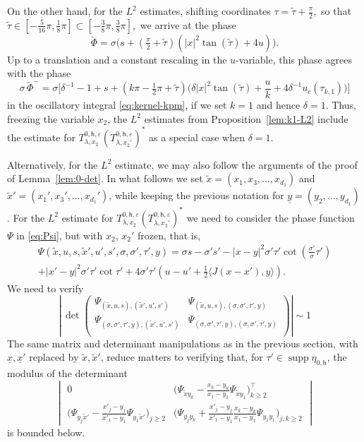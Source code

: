 \documentclass[leqno]{amsart}
\theoremstyle{definition}
\theoremstyle{remark}
\numberwithin{equation}{section}
\DeclareMathOperator*{\supp}{supp}
\begin{document}
On the other hand, for the $L^2$ estimates, shifting  coordinates $\tau=\tilde \tau +\tfrac \pi 2,$ so that $\tilde \tau\in [-\tfrac 5{16} \pi, \tfrac 18 \pi]\subset[-\tfrac 38 \pi,\tfrac 38\pi],$ we arrive at the phase
\begin{equation}\label{eq:brevePhi-0}
\breve\Phi
 = \sigma\big(s+(\tfrac \pi 2+\tilde\tau )(|x|^2 \tan(\tilde\tau) + 4u)\big).
\end{equation}
Up to a translation and a constant rescaling in the $u$-variable, this phase agrees with the phase
\[
\sigma \, \tilde \Phi^{-} = \sigma\Big[\delta^{-1}-1+s +\left(k\pi -\tfrac12\pi+\tilde\tau\right) \Big(\delta |x|^2 \tan(\tilde\tau)+\frac {u}{k} +4\delta^{-1} u_c(\tau_{k,1})\Big)\Big]
\]
in the oscillatory integral \eqref{eq:kernel-kpm}, if we set $k=1$ and hence $\delta=1$.
Thus, freezing the variable $x_2$, the $L^2$ estimates from Proposition~\ref{lem:k1-L2} include the estimate for $T_{\lambda,x_2}^{0,\mathsf{h},\varepsilon} (T_{\lambda,x_2'}^{0,\mathsf{h},\varepsilon} )^*$ as a special case when $\delta=1$.

Alternatively, for the $L^2$ estimate, we may also follow the arguments of the proof of Lemma~\ref{lem:0-det}. In what follows we set $\tilde x=(x_1,x_3,\dots, x_{d_1})$ and $\tilde x'=(x_1',x_3',\dots, x_{d_1}')$, while keeping the previous notation for $\underline y=(y_2,\dots, y_{d_1})$. For the $L^2$ estimate for $T_{\lambda,x_2}^{0,\mathsf{h},\varepsilon} (T_{\lambda,x_2'}^{0,\mathsf{h},\varepsilon})^*$ we need to consider the phase function $\Psi$ in \eqref{eq:Psi}, but with $x_2$, $x_2'$ frozen, that is,
\begin{multline*}
\Psi(\tilde x,u,s, \tilde x',u',s', \sigma,\sigma',\tau',y)  = \sigma s - \sigma's'  - \left|x-y\right|^2\sigma'\tau' \cot(\tfrac{\sigma'}\sigma \tau') \\ 
 + \left|x'-y\right|^2\sigma' \tau' \cot \tau' + 4\sigma'\tau'(u-u' + \tfrac12\langle J(x-x'),y \rangle).
\end{multline*}
We need to verify 
\[
\left| \,
\det
\begin{pmatrix}
\Psi_{(\tilde x, u,s),(\tilde x', u',s')} & \Psi_{(\tilde x, u,s),(\sigma,\sigma',\tau',y)}\\
\Psi_{(\sigma,\sigma',\tau',y),(\tilde x', u',s')} & \Psi_{(\sigma,\sigma',\tau',y),(\sigma,\sigma',\tau',y)}\\
\end{pmatrix}
\right|
\sim 1
\]
The same matrix and determinant manipulations as in the previous section, with $\underline x, \underline x'$ replaced by $\tilde x, \tilde x'$, reduce matters to verifying that, for $\tau'\in\supp\eta_{0,\mathsf{h}}$, the modulus of the determinant
\[
\begin{vmatrix}
0 & \big(\Psi_{\tilde x y_k} - \tfrac{x_k-y_k}{x_1-y_1} \Psi_{\tilde x y_1}\big)_{k\ge 2}^\intercal \\
\big(\Psi_{y_j\tilde x'} -\tfrac{x'_j-y_j}{x'_1-y_1}\Psi_{y_1\tilde x'}\big)_{j\ge 2} & \big(\Psi_{y_j y_k} + \tfrac{x'_j-y_j}{x'_1-y_1}\tfrac{x_k-y_k}{x_1-y_1}\Psi_{y_1 y_1}\big)_{j,k\ge 2}
\end{vmatrix}
\]
is bounded below. 
\end{document}
